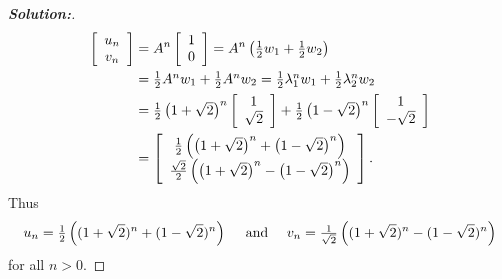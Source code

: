 \documentclass[a4paper]{amsart}
\theoremstyle{definition}
\newenvironment{solution}{\begin{proof}[\textbf{Solution:}] \vphantom{u}}{\end{proof}}
\begin{document}
\begin{solution}
\begin{align*}
 \left[ \begin{array}{c}u_{n}\\ v_{n} \end{array} \right] &=
   A^{n} \left[ \begin{array}{c}1\\ 0 \end{array} \right] =
   A^{n}\left({\textstyle \tfrac{1}{2} w_1 + \tfrac{1}{2} w_2}\right) \\
  & = {\textstyle \tfrac{1}{2} A^nw_1 + \tfrac{1}{2} A^nw_2 } =
      {\textstyle \tfrac{1}{2}\lambda_1^nw_1 + \tfrac{1}{2}\lambda_2^nw_2 }\\
  & = {\textstyle \tfrac{1}{2}}\left(\textstyle 1+\sqrt{2}\right)^{n}
       \left[ \begin{array}{c}1 \\ \sqrt{2} \end{array} \right] +
      {\textstyle \tfrac{1}{2}}\left(\textstyle 1-\sqrt{2}\right)^{n}
       \left[ \begin{array}{c}1 \\ -\sqrt{2} \end{array} \right]
  \\& =
       \left[ \begin{array}{c} {\textstyle \tfrac{1}{2}}\left(\left(\textstyle 1+\sqrt{2}\right)^{n} + \left(\textstyle 1-\sqrt{2}\right)^{n}\right)  \\
       {\textstyle \frac{\sqrt{2}}{2}}\left(\left(\textstyle 1+\sqrt{2}\right)^{n} - \left(\textstyle 1-\sqrt{2}\right)^{n}\right)  \\
       \end{array} \right].
 \end{align*}
 Thus
 \[
    u_n={\textstyle \tfrac{1}{2}}\left( (1+\sqrt{2})^n + (1-\sqrt{2})^n\right)
    \quad \text{~and~} \quad
    v_n={\textstyle \frac{1}{\sqrt{2}}}\left((1+\sqrt{2})^n-(1-\sqrt{2})^n\right)
 \]
 for all $n > 0$.
\end{solution}
\end{document}
